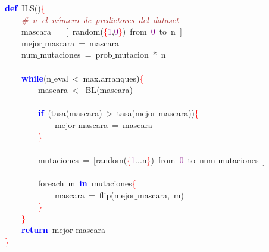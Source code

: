 \noindent
\mbox{}\textbf{\textcolor{Blue}{def}}\ ILS\textcolor{BrickRed}{()}\textcolor{Red}{\{} \\
\mbox{}\ \ \ \ \textit{\textcolor{Brown}{\#\ n\ el\ número\ de\ predictores\ del\ dataset}} \\
\mbox{}\ \ \ \ mascara\ \textcolor{BrickRed}{=}\ \textcolor{BrickRed}{[}\ random\textcolor{BrickRed}{(}\textcolor{Red}{\{}\textcolor{Purple}{1}\textcolor{BrickRed}{,}\textcolor{Purple}{0}\textcolor{Red}{\}}\textcolor{BrickRed}{)}\ from\ \textcolor{Purple}{0}\ to\ n\ \textcolor{BrickRed}{]} \\
\mbox{}\ \ \ \ mejor$\_$mascara\ \textcolor{BrickRed}{=}\ mascara \\
\mbox{}\ \ \ \ num$\_$mutaciones\ \textcolor{BrickRed}{=}\ prob$\_$mutacion\ \textcolor{BrickRed}{*}\ n \\
\mbox{} \\
\mbox{}\ \ \ \ \textbf{\textcolor{Blue}{while}}\textcolor{BrickRed}{(}n$\_$eval\ \textcolor{BrickRed}{\textless{}}\ max\textcolor{BrickRed}{.}arranques\textcolor{BrickRed}{)}\textcolor{Red}{\{} \\
\mbox{}\ \ \ \ \ \ \ \ mascara\ \textcolor{BrickRed}{\textless{}-}\ BL\textcolor{BrickRed}{(}mascara\textcolor{BrickRed}{)} \\
\mbox{} \\
\mbox{}\ \ \ \ \ \ \ \ \textbf{\textcolor{Blue}{if}}\ \textcolor{BrickRed}{(}tasa\textcolor{BrickRed}{(}mascara\textcolor{BrickRed}{)}\ \textcolor{BrickRed}{\textgreater{}}\ tasa\textcolor{BrickRed}{(}mejor$\_$mascara\textcolor{BrickRed}{))}\textcolor{Red}{\{} \\
\mbox{}\ \ \ \ \ \ \ \ \ \ \ \ mejor$\_$mascara\ \textcolor{BrickRed}{=}\ mascara \\
\mbox{}\ \ \ \ \ \ \ \ \textcolor{Red}{\}} \\
\mbox{} \\
\mbox{}\ \ \ \ \ \ \ \ mutaciones\ \textcolor{BrickRed}{=}\ \textcolor{BrickRed}{[}random\textcolor{BrickRed}{(}\textcolor{Red}{\{}\textcolor{Purple}{1}\textcolor{BrickRed}{...}n\textcolor{Red}{\}}\textcolor{BrickRed}{)}\ from\ \textcolor{Purple}{0}\ to\ num$\_$mutaciones\ \textcolor{BrickRed}{]} \\
\mbox{} \\
\mbox{}\ \ \ \ \ \ \ \ foreach\ m\ \textbf{\textcolor{Blue}{in}}\ mutaciones\textcolor{Red}{\{} \\
\mbox{}\ \ \ \ \ \ \ \ \ \ \ \ mascara\ \textcolor{BrickRed}{=}\ flip\textcolor{BrickRed}{(}mejor$\_$mascara\textcolor{BrickRed}{,}\ m\textcolor{BrickRed}{)} \\
\mbox{}\ \ \ \ \ \ \ \ \textcolor{Red}{\}} \\
\mbox{}\ \ \ \ \textcolor{Red}{\}} \\
\mbox{}\ \ \ \ \textbf{\textcolor{Blue}{return}}\ mejor$\_$mascara \\
\mbox{}\textcolor{Red}{\}} \\
\mbox{}
